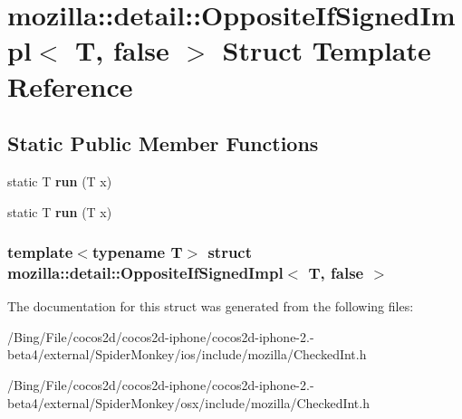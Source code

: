 \hypertarget{structmozilla_1_1detail_1_1_opposite_if_signed_impl_3_01_t_00_01false_01_4}{\section{mozilla\-:\-:detail\-:\-:Opposite\-If\-Signed\-Impl$<$ T, false $>$ Struct Template Reference}
\label{structmozilla_1_1detail_1_1_opposite_if_signed_impl_3_01_t_00_01false_01_4}
}
\subsection*{Static Public Member Functions}
\begin{DoxyCompactItemize}
\item 
\hypertarget{structmozilla_1_1detail_1_1_opposite_if_signed_impl_3_01_t_00_01false_01_4_ab1f170aa7b3137414f278e443877f8ad}{static T {\bfseries run} (T x)}\label{structmozilla_1_1detail_1_1_opposite_if_signed_impl_3_01_t_00_01false_01_4_ab1f170aa7b3137414f278e443877f8ad}

\item 
\hypertarget{structmozilla_1_1detail_1_1_opposite_if_signed_impl_3_01_t_00_01false_01_4_ab1f170aa7b3137414f278e443877f8ad}{static T {\bfseries run} (T x)}\label{structmozilla_1_1detail_1_1_opposite_if_signed_impl_3_01_t_00_01false_01_4_ab1f170aa7b3137414f278e443877f8ad}

\end{DoxyCompactItemize}
\subsubsection*{template$<$typename T$>$ struct mozilla\-::detail\-::\-Opposite\-If\-Signed\-Impl$<$ T, false $>$}



The documentation for this struct was generated from the following files\-:\begin{DoxyCompactItemize}
\item 
/\-Bing/\-File/cocos2d/cocos2d-\/iphone/cocos2d-\/iphone-\/2.-\/beta4/external/\-Spider\-Monkey/ios/include/mozilla/Checked\-Int.\-h\item 
/\-Bing/\-File/cocos2d/cocos2d-\/iphone/cocos2d-\/iphone-\/2.-\/beta4/external/\-Spider\-Monkey/osx/include/mozilla/Checked\-Int.\-h\end{DoxyCompactItemize}
